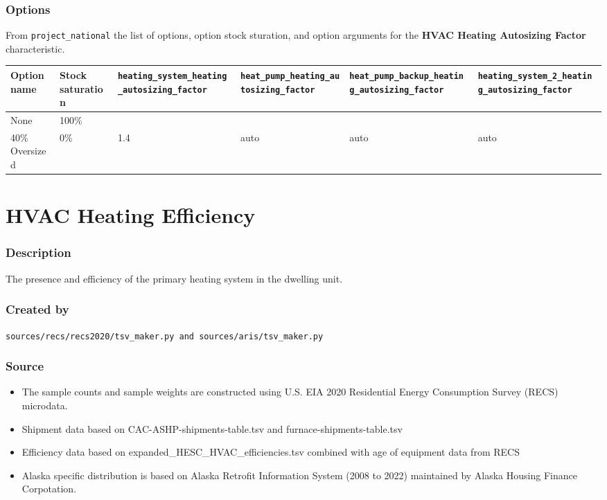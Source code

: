 \subsubsection{Options}\label{options-70}

From \texttt{project\_national} the list of options, option stock
sturation, and option arguments for the \textbf{HVAC Heating Autosizing
Factor} characteristic.

\begin{longtable}[]{@{}llllll@{}}
\toprule\noalign{}
Option name & Stock saturation &
\texttt{heating\_system\_heating\_autosizing\_factor} &
\texttt{heat\_pump\_heating\_autosizing\_factor} &
\texttt{heat\_pump\_backup\_heating\_autosizing\_factor} &
\texttt{heating\_system\_2\_heating\_autosizing\_factor} \\
\midrule\noalign{}
\endhead
\bottomrule\noalign{}
\endlastfoot
None & 100\% & & & & \\
40\% Oversized & 0\% & 1.4 & auto & auto & auto \\
\end{longtable}

\section{HVAC Heating Efficiency}\label{hvac_heating_efficiency}

\subsubsection{Description}\label{description-71}

The presence and efficiency of the primary heating system in the
dwelling unit.

\subsubsection{Created by}\label{created-by-71}

\texttt{sources/recs/recs2020/tsv\_maker.py\ and\ sources/aris/tsv\_maker.py}

\subsubsection{Source}\label{source-70}

\begin{itemize}
 
\item
  The sample counts and sample weights are constructed using U.S. EIA
  2020 Residential Energy Consumption Survey (RECS) microdata.
\item
  Shipment data based on CAC-ASHP-shipments-table.tsv and
  furnace-shipments-table.tsv
\item
  Efficiency data based on expanded\_HESC\_HVAC\_efficiencies.tsv
  combined with age of equipment data from RECS
\item
  Alaska specific distribution is based on Alaska Retrofit Information
  System (2008 to 2022) maintained by Alaska Housing Finance
  Corpotation.
\end{itemize}

